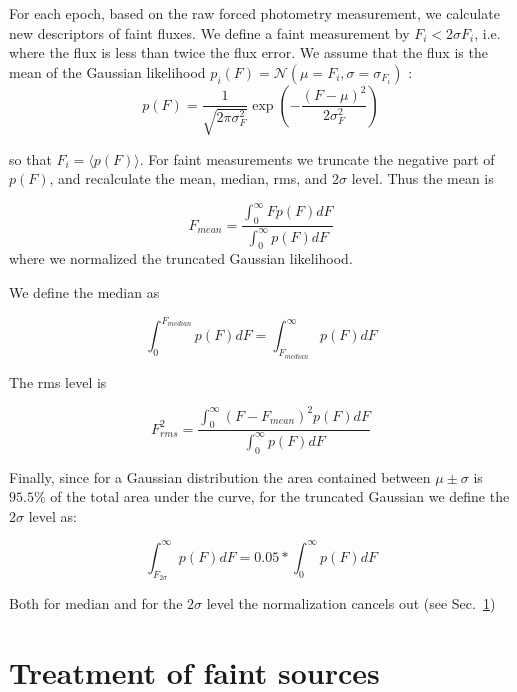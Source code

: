 \documentclass[fleqn,usenatbib]{mnras}  %
\begin{document}
For each epoch, based on the raw forced photometry measurement, we calculate new descriptors of faint fluxes. We define a faint measurement by $F_{i} < 2 \sigma{F_{i}}$, i.e. where the flux is less than twice the flux error. We assume that the flux is the mean of the Gaussian likelihood  $p_{i}(F) = \mathcal{N}(\mu=F_{i}, \sigma=\sigma_{F_{i}})$ : 
\begin{equation}
p(F) = \frac{1}{\sqrt{2  \pi \sigma_{F}^{2}}} \exp{ \left(-\frac{(F-\mu)^{2}}{2\sigma_{F}^{2}}\right)}
\end{equation}

so that $F_{i} =\langle p(F) \rangle $.  For faint measurements we truncate the negative part of $p(F)$, and recalculate the mean, median, rms, and $2 \sigma$ level. Thus the mean is  


\begin{equation}
F_{mean} = \frac{\int _{0} ^ {\infty}{F p(F) dF}}{\int _{0} ^ {\infty}{p(F) dF}}
\end{equation} 
where we normalized the truncated Gaussian likelihood.
 
We define the median as  

\begin{equation}
\int _{0} ^ {F_{median}} {p(F) dF} = \int _{F_{median}} ^ {\infty} {p(F) dF}
\end{equation} 

The rms level is

\begin{equation}
F_{rms}^{2} = \frac{\int _{0} ^ {\infty}{(F-F_{mean})^{2} p(F) dF}}{\int _{0} ^ {\infty}{p(F) dF}} 
\end{equation}

Finally, since for a Gaussian distribution the area contained between $\mu \pm \sigma$ is $95.5 \%$ of the total area under the curve, for the truncated Gaussian we define the  $2 \sigma$ level as:

\begin{equation}
\label{eq:sigma}
\int _{F_{2 \sigma}} ^{\infty} {p(F)dF} = 0.05 * \int _{0} ^{\infty} {p(F) dF} 
\end{equation}

Both for median and for the $2\sigma$ level the normalization cancels out (see Sec.~\ref{sec:analytic})


\section{Treatment of faint sources}
\label{sec:analytic}
\end{document}
